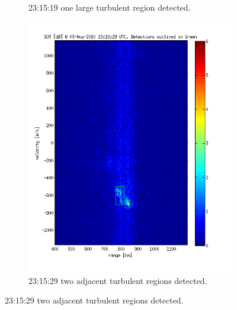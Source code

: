\begin{figure}
\begin{subfigure}[t]{0.45\linewidth}
        \caption{23:15:19 one large turbulent region detected.}
    \end{subfigure}
    \begin{subfigure}[t]{0.45\linewidth}
        \includegraphics[width=\linewidth]{gfx/out-003}
        \caption{23:15:29 two adjacent turbulent regions detected.}
    \end{subfigure}
\end{figure}
